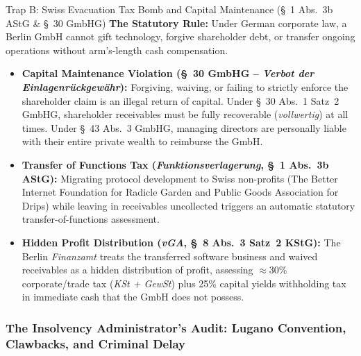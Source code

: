 \documentclass[a4paper,11pt,twoside,parskip=half-,headings=small]{scrartcl}
\begin{document}
\begin{warnbox}{Trap B: Swiss Evacuation Tax Bomb and Capital Maintenance (\S~1 Abs.~3b AStG \& \S~30 GmbHG)}
\textbf{The Statutory Rule:} Under German corporate law, a Berlin GmbH cannot gift technology, forgive shareholder debt, or transfer ongoing operations without arm's-length cash compensation.
\begin{itemize}[nosep]
  \item \textbf{Capital Maintenance Violation (\S~30 GmbHG -- \emph{Verbot der Einlagenrückgewähr}):} Forgiving, waiving, or failing to strictly enforce the  shareholder claim is an illegal return of capital. Under \S~30 Abs.~1 Satz~2 GmbHG, shareholder receivables must be fully recoverable (\emph{vollwertig}) at all times. Under \S~43 Abs.~3 GmbHG, managing directors are personally liable with their entire private wealth to reimburse the GmbH.
  \item \textbf{Transfer of Functions Tax (\emph{Funktionsverlagerung}, \S~1 Abs.~3b AStG):} Migrating protocol development to Swiss non-profits (The Better Internet Foundation for Radicle Garden and Public Goods Association for Drips) while leaving  in receivables uncollected triggers an automatic statutory transfer-of-functions assessment.
  \item \textbf{Hidden Profit Distribution (\emph{vGA}, \S~8 Abs.~3 Satz~2 KStG):} The Berlin \emph{Finanzamt} treats the transferred software business and waived receivables as a hidden distribution of profit, assessing $\approx$30\% corporate/trade tax (\emph{KSt + GewSt}) plus 25\% capital yields withholding tax in immediate cash that the GmbH does not possess.
\end{itemize}
\end{warnbox}

\clearpage

\subsubsection{The Insolvency Administrator's Audit: Lugano Convention, Clawbacks, and Criminal Delay}
\label{sec:insolvency_administrator_audit}
\end{document}
